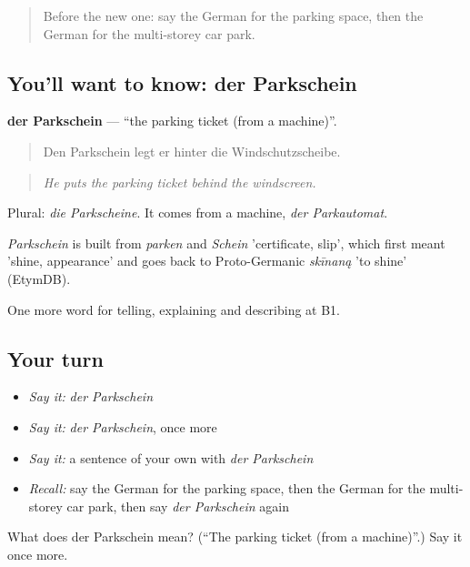 \label{lesson:GE-C406-parkschein}



\begin{quote}
Before the new one: say the German for the parking space, then the German for the multi-storey car park.
\end{quote}

\subsection*{You'll want to know: der Parkschein}
\textbf{der Parkschein} — \textquotedblleft{}the parking ticket (from a machine)\textquotedblright{}.

\begin{quote}
Den Parkschein legt er hinter die Windschutzscheibe.
\end{quote}

\begin{quote}
\emph{He puts the parking ticket behind the windscreen.}
\end{quote}

Plural: \emph{die Parkscheine}. It comes from a machine, \emph{der Parkautomat}.

\begin{cousinweb}
\emph{Parkschein} is built from \emph{parken} and \emph{Schein} 'certificate, slip', which first meant 'shine, appearance' and goes back to Proto-Germanic \emph{skīnaną} 'to shine' (EtymDB).
\end{cousinweb}

\begin{grammarlens}[title={What you've built}]
One more word for telling, explaining and describing at B1.
\end{grammarlens}

\subsection*{Your turn}
\begin{itemize}
\raggedright
  \item \emph{Say it:} \emph{der Parkschein}
  \item \emph{Say it:} \emph{der Parkschein}, once more
  \item \emph{Say it:} a sentence of your own with \emph{der Parkschein}
  \item \emph{Recall:} say the German for the parking space, then the German for the multi-storey car park, then say \emph{der Parkschein} again
\end{itemize}

\begin{tcolorbox}[breakable,colback=teal!4,colframe=teal!35!black,title={Before you move on}]
What does der Parkschein mean? (\textquotedblleft{}The parking ticket (from a machine)\textquotedblright{}.) Say it once more.
\end{tcolorbox}
